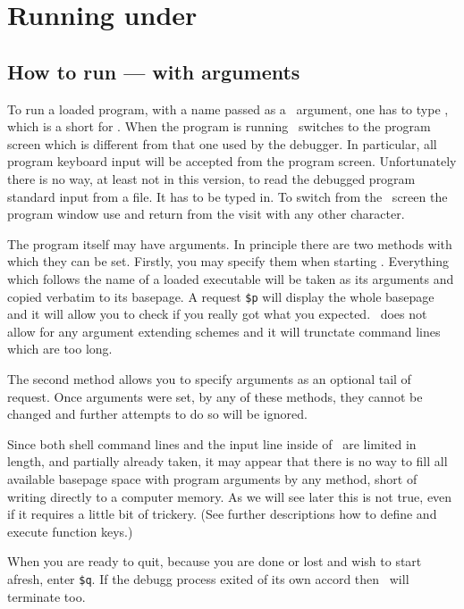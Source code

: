 \section{Running under \szadb}

\subsection{How to run --- with arguments}
To run a loaded program, with a name passed as a \szadb\ argument,
one has to type , which is a short for .
When the program is running \szadb\ switches to the program screen which
is different from that one used by the debugger.
In particular, all program keyboard input will be accepted from the program
screen.  Unfortunately there is no way, at least not in this version,
to read the debugged program standard input from a file.  It has to
be typed in.
To switch from the \szadb\ screen the program window use 
and return from the visit with any other character.

The program itself may have arguments.  In principle there are
two methods with which they can be set.
Firstly, you may specify them when starting \szadb.
Everything which
follows the name of a loaded executable will be taken as its arguments
and copied verbatim to its basepage. A request \verb|$p| will display the
whole basepage and it will allow you to check if you really got what
you expected.
\szadb\ does not allow for any argument extending schemes
and it will trunctate command lines which are too long.

The second method allows you to specify arguments as an optional tail
of  request.  Once arguments were set, by any of these methods,
they cannot be changed and further attempts to do so will be ignored.

Since both shell command lines and 
the input line inside of \szadb\ are limited in length,
and partially already taken,
it may appear that there is no way to fill all available basepage
space with program arguments by any method,
short of writing directly to a computer memory.
As we will see later this is not true, even if 
it requires a little bit of trickery.
(See further descriptions how to define and execute function keys.)

When you are ready to quit, because you are done or lost and wish to start
afresh, enter \verb|$q|. If the debugg process exited of its own accord
then \szadb\ will terminate too.


